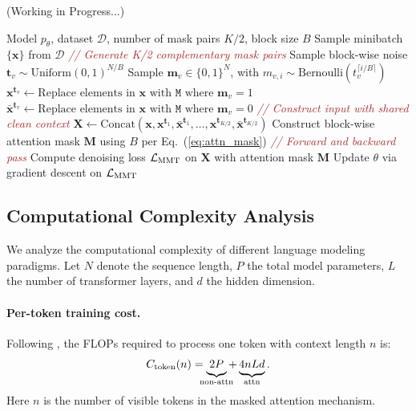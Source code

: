 (Working in Progress...)

\begin{algorithm}[t]
\caption{\name{} Training}
\label{alg:mmt}
\begin{algorithmic}[1]
\REQUIRE Model $p_\theta$, dataset $\mathcal{D}$, number of mask pairs $K/2$, block size $B$
    \STATE Sample minibatch $\{\mathbf{x}\}$ from $\mathcal{D}$
    \STATE \textcolor{brown}{\textit{// Generate K/2 complementary mask pairs}}
        \STATE Sample block-wise noise $\boldsymbol{t}_v \sim \text{Uniform}(0, 1)^{N/B}$
        \STATE Sample $\mathbf{m}_v \in \{0,1\}^N$, with $m_{v,i} \sim \text{Bernoulli}(t_v^{\lceil i/B \rceil})$
        \STATE $\mathbf{x}^{\boldsymbol{t}_v} \gets \text{Replace elements in } \mathbf{x} \text{ with } \mathtt{M} \text{ where } \mathbf{m}_v = 1$
        \STATE $\bar{\mathbf{x}}^{\boldsymbol{t}_v} \gets \text{Replace elements in } \mathbf{x} \text{ with } \mathtt{M} \text{ where } \mathbf{m}_v = 0$
    \ENDFOR
    \STATE \textcolor{brown}{\textit{// Construct input with shared clean context}}
    \STATE $\mathbf{X} \gets \text{Concat}(\mathbf{x}, \mathbf{x}^{\boldsymbol{t}_1}, \bar{\mathbf{x}}^{\boldsymbol{t}_1}, \ldots, \mathbf{x}^{\boldsymbol{t}_{K/2}}, \bar{\mathbf{x}}^{\boldsymbol{t}_{K/2}})$
    \STATE Construct block-wise attention mask $\mathbf{M}$ using $B$ per Eq.~(\ref{eq:attn_mask})
    \STATE \textcolor{brown}{\textit{// Forward and backward pass}}
    \STATE Compute denoising loss $\mathcal{L}_{\text{MMT{}}}$ on $\mathbf{X}$ with attention mask $\mathbf{M}$
    \STATE Update $\theta$ via gradient descent on $\mathcal{L}_{\text{MMT{}}}$
\ENDFOR
\end{algorithmic}
\end{algorithm}

\subsection{Computational Complexity Analysis}

We analyze the computational complexity of different language modeling paradigms.
Let $N$ denote the sequence length, $P$ the total model parameters, $L$ the number of transformer layers, and $d$ the hidden dimension.

\paragraph{Per-token training cost.}
Following \citet{chen-etal-2025-cost}, the FLOPs required to process one token with context length $n$ is:
\begin{equation}
    C_{\text{token}}(n) = \underbrace{2P\vphantom{()}}_{\mathclap{\text{non-attn}}} + \underbrace{4n L d\vphantom{()}}_{\mathclap{\text{attn}}}.
\end{equation}
Here $n$ is the number of visible tokens in the masked attention mechanism.

